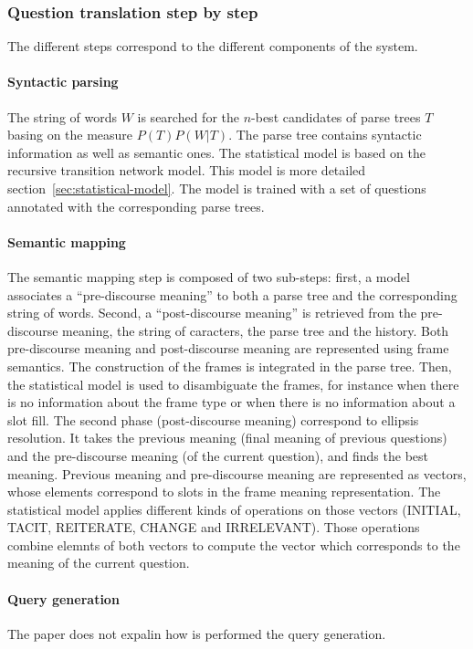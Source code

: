 \documentclass[10pt,journal,letterpaper,compsoc]{IEEEtran}
\begin{document}
\subsubsection{Question translation step by step}
The different steps correspond to the different components of the system.
\paragraph{Syntactic parsing}The string of words $W$ is searched for
the $n$-best candidates of parse trees $T$ basing on the measure $P(T)P(W|T)$.
The parse tree contains syntactic information as well as semantic ones.
The statistical model is based on the recursive transition network model. This
model is more detailed section~\ref{sec:statistical-model}.
The model is trained with a set of questions annotated with the corresponding
parse trees.

\paragraph{Semantic mapping}The semantic mapping step is composed of two
sub-steps: first, a model associates a ``pre-discourse meaning'' to both a parse
tree and the corresponding string of words. Second, a ``post-discourse meaning''
is retrieved from the pre-discourse meaning, the string of caracters, the parse
tree and the history.
Both pre-discourse meaning and post-discourse meaning are represented using
frame semantics.
The construction of the frames is integrated in the parse tree. Then, the
statistical model is used to disambiguate the frames, for instance when there is
no information about the frame type or when there is no information about a slot
fill.
The second phase (post-discourse meaning) correspond to ellipsis resolution. It
takes the previous meaning (final meaning of previous questions) and the
pre-discourse meaning (of the current question), and finds the best meaning.
Previous meaning and pre-discourse meaning are represented as vectors, whose
elements correspond to slots in the frame meaning representation. The
statistical model applies different kinds of operations on those vectors
(INITIAL, TACIT, REITERATE, CHANGE and IRRELEVANT). Those operations combine
elemnts of both vectors to compute the vector which corresponds to the meaning
of the current question.
\paragraph{Query generation}
The paper does not expalin how is performed the query generation.
\end{document}
